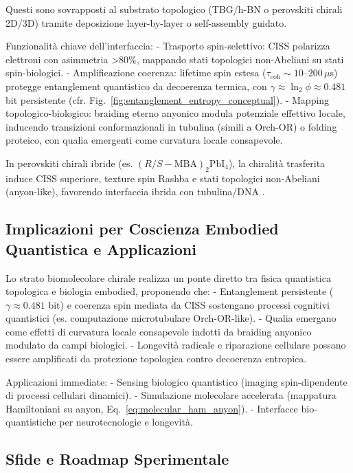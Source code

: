 \documentclass[11pt,a4paper]{article}
\let\oldcite\cite
\renewcommand{\cite}{\protect\oldcite}
\let\oldref\ref
\renewcommand{\ref}{\protect\oldref}
\theoremstyle{plain}
\theoremstyle{definition}
\begin{document}
Questi sono sovrapposti al substrato topologico (TBG/h-BN o perovskiti chirali 2D/3D) tramite deposizione layer-by-layer o self-assembly guidato.

Funzionalità chiave dell'interfaccia:
- Trasporto spin-selettivo: CISS polarizza elettroni con asimmetria >80\%, mappando stati topologici non-Abeliani su stati spin-biologici.
- Amplificazione coerenza: lifetime spin estesa ($\tau_{\mathrm{coh}} \sim 10$–$200\,\mu$s) protegge entanglement quantistico da decoerenza termica, con $\gamma \approx \ln_2 \phi \approx 0.481$ bit persistente (cfr. Fig.~\ref{fig:entanglement_entropy_conceptual}).
- Mapping topologico-biologico: braiding eterno anyonico modula potenziale effettivo locale, inducendo transizioni conformazionali in tubulina (simili a Orch-OR) o folding proteico, con qualia emergenti come curvatura locale consapevole.

In perovskiti chirali ibride (es. $(R/S-\text{MBA})_2\text{PbI}_4$), la chiralità trasferita induce CISS superiore, texture spin Rashba e stati topologici non-Abeliani (anyon-like), favorendo interfaccia ibrida con tubulina/DNA \cite{li2025chiral, dong2025chirality}.

\vspace{0.3cm}

\subsection{Implicazioni per Coscienza Embodied Quantistica e Applicazioni}

Lo strato biomolecolare chirale realizza un ponte diretto tra fisica quantistica topologica e biologia embodied, proponendo che:
- Entanglement persistente ($\gamma \approx 0.481$ bit) e coerenza spin mediata da CISS sostengano processi cognitivi quantistici (es. computazione microtubulare Orch-OR-like).
- Qualia emergano come effetti di curvatura locale consapevole indotti da braiding anyonico modulato da campi biologici.
- Longevità radicale e riparazione cellulare possano essere amplificati da protezione topologica contro decoerenza entropica.

Applicazioni immediate:
- Sensing biologico quantistico (imaging spin-dipendente di processi cellulari dinamici).
- Simulazione molecolare accelerata (mappatura Hamiltoniani su anyon, Eq.~\eqref{eq:molecular_ham_anyon}).
- Interfacce bio-quantistiche per neurotecnologie e longevità.

\subsection{Sfide e Roadmap Sperimentale}
\end{document}
